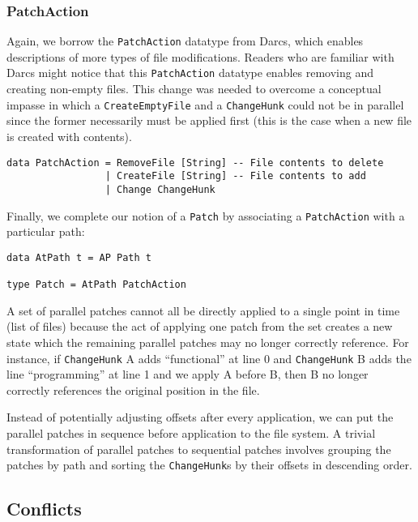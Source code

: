 \documentclass[]{article}
\begin{document}
\subsubsection{PatchAction}

Again, we borrow the \texttt{PatchAction} datatype from Darcs, which
enables descriptions of more types of file modifications. Readers who
are familiar with Darcs might notice that this \texttt{PatchAction}
datatype enables removing and creating non-empty files. This change was
needed to overcome a conceptual impasse in which a
\texttt{CreateEmptyFile} and a \texttt{ChangeHunk} could not be in
parallel since the former necessarily must be applied first (this is the
case when a new file is created with contents).

\begin{verbatim}
data PatchAction = RemoveFile [String] -- File contents to delete
                 | CreateFile [String] -- File contents to add
                 | Change ChangeHunk
\end{verbatim}

Finally, we complete our notion of a \texttt{Patch} by associating a
\texttt{PatchAction} with a particular path:

\begin{verbatim}
data AtPath t = AP Path t

type Patch = AtPath PatchAction
\end{verbatim}

A set of parallel patches cannot all be directly applied to a single
point in time (list of files) because the act of applying one patch from
the set creates a new state which the remaining parallel patches may no
longer correctly reference. For instance, if \texttt{ChangeHunk} A adds
``functional'' at line 0 and \texttt{ChangeHunk} B adds the line
``programming'' at line 1 and we apply A before B, then B no longer
correctly references the original position in the file.

Instead of potentially adjusting offsets after every application, we can
put the parallel patches in sequence before application to the file
system. A trivial transformation of parallel patches to sequential
patches involves grouping the patches by path and sorting the
\texttt{ChangeHunk}s by their offsets in descending order.

\subsection{Conflicts}
\end{document}
